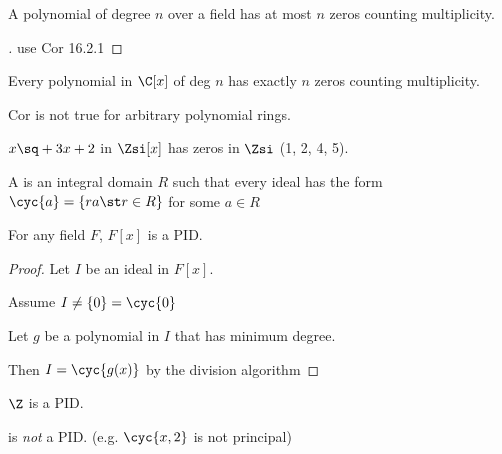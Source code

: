 \documentclass[a4paper]{article}
\begin{document}
\begin{corollary}
  A polynomial of degree \( n \) over a field has at most \( n \) zeros counting multiplicity.
\end{corollary}

\begin{proof}[]
  use Cor 16.2.1
\end{proof}

\begin{example}
  Every polynomial in \( \C[x] \) of deg \( n \) has exactly \( n \) zeros counting multiplicity.
\end{example}

Cor is not true for arbitrary polynomial rings.

\begin{example}
  \( x\sq+3x+2 \) in \( \Zsi[x] \) has  zeros in \( \Zsi \) (1, 2, 4, 5).
\end{example}

\begin{definition}
  A  is an integral domain \( R \) such that every ideal has the form \( \cyc{a}=\{ra\st r\in R\} \) for some \( a\in R \)
\end{definition}

\begin{theorem}
  For any field \( F \), \( F[x] \) is a PID.
\end{theorem}

\begin{proof}
  Let \( I \) be an ideal in \( F[x] \).

  Assume \( I\neq \{0\}=\cyc{0} \)

  Let \( g \) be a polynomial in \( I \) that has minimum degree.

  Then \( I=\cyc{g(x)} \) by the division algorithm
\end{proof}

\begin{theorem}
  \( \Z \) is a PID.
\end{theorem}

\begin{example}
  \Z[x] is \emph{not} a PID. (e.g. \( \cyc{x,2} \) is not principal)
\end{example}
\end{document}
